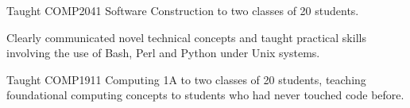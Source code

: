 \documentclass[letter]{deedy-resume} %
\begin{document}
\begin{minipage}[t]{0.66\textwidth}


\begin{tightitemize}
\item Taught COMP2041 Software Construction to two classes of 20 students.
\item Clearly communicated novel technical concepts and taught practical skills involving the use of Bash, Perl and Python under Unix systems.
\item Taught COMP1911 Computing 1A to two classes of 20 students, teaching foundational computing concepts to students who had never touched code before.
\end{tightitemize}

\sectionspace %











\end{minipage}
\end{document}
